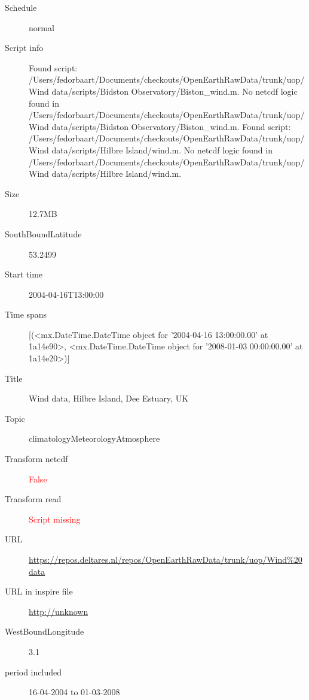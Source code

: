 \documentclass[9]{report}
\begin{document}
\begin{description}
\begin{verbatim}
\end{verbatim}
  \item[Schedule] normal
  \item[Script info] Found script: /Users/fedorbaart/Documents/checkouts/OpenEarthRawData/trunk/uop/Wind data/scripts/Bidston Observatory/Biston\_wind.m.
No netcdf logic found in /Users/fedorbaart/Documents/checkouts/OpenEarthRawData/trunk/uop/Wind data/scripts/Bidston Observatory/Biston\_wind.m.
Found script: /Users/fedorbaart/Documents/checkouts/OpenEarthRawData/trunk/uop/Wind data/scripts/Hilbre Island/wind.m.
No netcdf logic found in /Users/fedorbaart/Documents/checkouts/OpenEarthRawData/trunk/uop/Wind data/scripts/Hilbre Island/wind.m.
  \item[Size] 12.7MB
  \item[SouthBoundLatitude] 53.2499
  \item[Start time] 2004-04-16T13:00:00
  \item[Time spans] [(<mx.DateTime.DateTime object for '2004-04-16 13:00:00.00' at 1a14e90>, <mx.DateTime.DateTime object for '2008-01-03 00:00:00.00' at 1a14e20>)]
  \item[Title]  Wind data, Hilbre Island, Dee Estuary, UK 
  \item[Topic] climatologyMeteorologyAtmosphere
  \item[Transform netcdf] \textcolor{red}{False}
  \item[Transform read] \textcolor{red}{Script missing}
  \item[URL] \href{https://repos.deltares.nl/repos/OpenEarthRawData/trunk/uop/Wind\%20data}{https://repos.deltares.nl/repos/OpenEarthRawData/trunk/uop/Wind\%20data}
  \item[URL in inspire file] \href{http://unknown}{http://unknown}
  \item[WestBoundLongitude] 3.1
  \item[period included] 16-04-2004 to 01-03-2008
\end{description}
\end{document}

